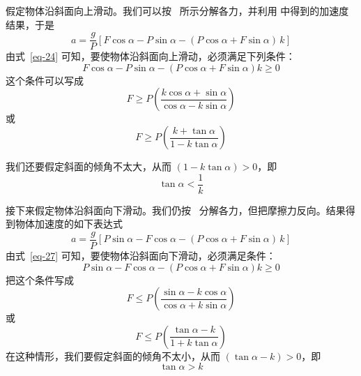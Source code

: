 \begin{dialogue}
假定物体沿斜面向上滑动。我们可以按~ 所示分解各力，并利用 中得到的加速度结果，于是
\begin{equation}%
a = \frac{g}{P} \left[F \cos \alpha- P \sin \alpha -(P \cos \alpha + F \sin \alpha) \, k \right]
\label{eq-24}
\end{equation}
由式~\eqref{eq-24} 可知，要使物体沿斜面向上滑动，必须满足下列条件：
\begin{equation*}%
F \cos \alpha - P \sin \alpha -\left( P \cos \alpha + F \sin \alpha \right) k \geqslant 0
\end{equation*}
这个条件可以写成
\begin{equation*}%
F \geqslant P \left ( \frac{k \cos \alpha + \sin \alpha}{\cos \alpha -k \sin \alpha} \right)
\end{equation*}
或
\begin{equation}%
F \geqslant P \left ( \frac{k + \tan \alpha}{ 1 -k \tan \alpha} \right)
\label{eq-25}
\end{equation}

我们还要假定斜面的倾角不太大，从而 $(1-k \tan \alpha) > 0$，即
\begin{equation}%
\tan \alpha < \frac{1}{k}
\label{eq-26}
\end{equation}

接下来假定物体沿斜面向下滑动。我们仍按~ 分解各力，但把摩擦力反向。结果得到物体加速度的如下表达式
\begin{equation}%
a= \frac{g}{P} \left[P \sin \alpha -F \cos \alpha - \left( P \cos \alpha + F \sin \alpha \right) \, k \right]
\label{eq-27}
\end{equation}
由式~\eqref{eq-27} 可知，要使物体沿斜面向下滑动，必须满足条件：
\begin{equation*}%
P \sin \alpha -F \cos \alpha - \left( P \cos \alpha + F \sin \alpha \right) k \geqslant 0
\end{equation*}
把这个条件写成
\begin{equation*}%
F \leqslant P \left ( \frac{ \sin \alpha - k \cos \alpha}{\cos \alpha + k \sin \alpha} \right)
\end{equation*}
或
\begin{equation}%
F \leqslant P \left ( \frac{ \tan \alpha -k }{ 1 + k \tan \alpha} \right)
\label{eq-28}
\end{equation}
在这种情形，我们要假定斜面的倾角不太小，从而 $(\tan \alpha- k)>0$，即
\begin{equation}%
\tan \alpha > k
\label{eq-29}
\end{equation}


\end{dialogue}
